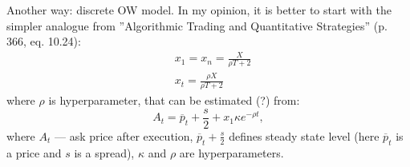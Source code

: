 \documentclass[aspectratio=169]{beamer}
\begin{document}
\begin{frame}{Another way: discrete OW model.}
    In my opinion, it is better to start with the simpler analogue from ''Algorithmic Trading and
    Quantitative Strategies'' (p. 366, eq. 10.24):
    \begin{align*}
        & x_1 = x_n = \frac{X}{\rho T + 2} \\
        & x_t = \frac{\rho X}{\rho T + 2}
    \end{align*}
    where $\rho$ is hyperparameter, that can be estimated (?) from:
    \begin{equation*}
        A_t = \overline p _t + \frac{s}{2} + x_1 \kappa e^{- \rho t},
    \end{equation*}
    where $A_t$ --- ask price after execution, $\overline p _t + \frac{s}{2}$ defines steady state level 
    (here $\overline p _t$ is a price and $s$ is a spread), $\kappa$ and $\rho$ are hyperparameters. 
\end{frame}
\end{document}

